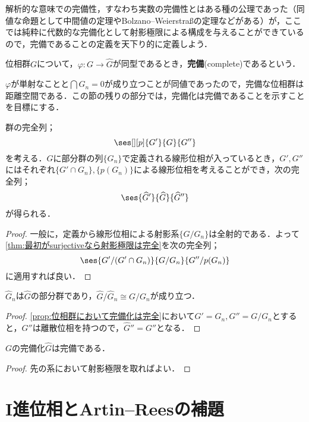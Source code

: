 解析的な意味での完備性，すなわち実数の完備性とはある種の公理であった（同値な命題として中間値の定理やBolzano--Weierstra\ss の定理などがある）が，ここでは純粋に代数的な完備化として射影極限による構成を与えることができているので，完備であることの定義を天下り的に定義しよう．

\begin{defi}[完備]
	位相群$G$について，$\varphi:G\to\widehat{G}$が同型であるとき，\textbf{完備}(complete)であるという．
\end{defi}

$\varphi$が単射なことと$\bigcap G_n=0$が成り立つことが同値であったので，完備な位相群は距離空間である．この節の残りの部分では，完備化は完備であることを示すことを目標にする．

\begin{prop}\label{prop:位相群において完備化は完全}
	群の完全列；
	\[\ses[][p]{G'}{G}{G''}\]
	を考える．$G$に部分群の列$\{G_n\}$で定義される線形位相が入っているとき，$G',G''$にはそれぞれ$\{G'\cap G_n\},\{p(G_n)\}$による線形位相を考えることができ，次の完全列；
	\[\ses{\widehat{G}'}{\widehat{G}}{\widehat{G}''}\]
	が得られる．
\end{prop}

\begin{proof}
	一般に，定義から線形位相による射影系$\{G/G_n\}$は全射的である．よって\ref{thm:最初がsurjectiveなら射影極限は完全}を次の完全列；
	\[\ses{G'/(G'\cap G_n)}{G/G_n}{G''/p(G_n)}\]
	に適用すれば良い．
\end{proof}

\begin{cor}\label{cor:完備化しても商は同型}
	$\widehat{G}_n$は$\widehat{G}$の部分群であり，$\widehat{G}/\widehat{G}_n\cong G/G_n$が成り立つ．
\end{cor}

\begin{proof}
	\ref{prop:位相群において完備化は完全}において$G'=G_n,G''=G/G_n$とすると，$G''$は離散位相を持つので，$\widehat{G}''=G''$となる．
\end{proof}

\begin{cor}
	$G$の完備化$\widehat{G}$は完備である．
\end{cor}

\begin{proof}
	先の系において射影極限を取ればよい．
\end{proof}

\section{I進位相とArtin--Reesの補題}

